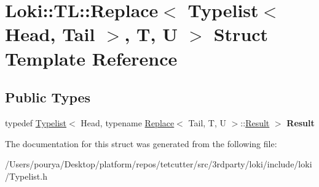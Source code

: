 \hypertarget{structLoki_1_1TL_1_1Replace_3_01Typelist_3_01Head_00_01Tail_01_4_00_01T_00_01U_01_4}{}\section{Loki\+:\+:T\+L\+:\+:Replace$<$ Typelist$<$ Head, Tail $>$, T, U $>$ Struct Template Reference}
\label{structLoki_1_1TL_1_1Replace_3_01Typelist_3_01Head_00_01Tail_01_4_00_01T_00_01U_01_4}
\subsection*{Public Types}
\begin{DoxyCompactItemize}
\item 
\hypertarget{structLoki_1_1TL_1_1Replace_3_01Typelist_3_01Head_00_01Tail_01_4_00_01T_00_01U_01_4_af279513a61fd735626f2e2ba8ae7cb95}{}typedef \hyperlink{structLoki_1_1Typelist}{Typelist}$<$ Head, typename \hyperlink{structLoki_1_1TL_1_1Replace}{Replace}$<$ Tail, T, U $>$\+::\hyperlink{structLoki_1_1Typelist}{Result} $>$ {\bfseries Result}\label{structLoki_1_1TL_1_1Replace_3_01Typelist_3_01Head_00_01Tail_01_4_00_01T_00_01U_01_4_af279513a61fd735626f2e2ba8ae7cb95}

\end{DoxyCompactItemize}


The documentation for this struct was generated from the following file\+:\begin{DoxyCompactItemize}
\item 
/\+Users/pourya/\+Desktop/platform/repos/tetcutter/src/3rdparty/loki/include/loki/Typelist.\+h\end{DoxyCompactItemize}
